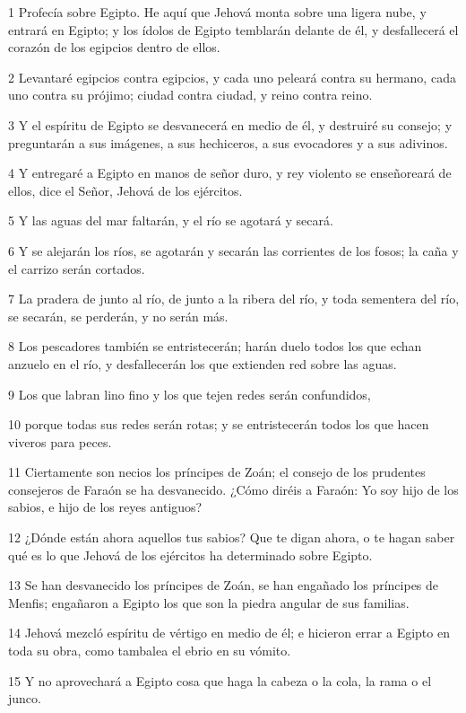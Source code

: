 \par 1 Profecía sobre Egipto. He aquí que Jehová monta sobre una ligera nube, y entrará en Egipto; y los ídolos de Egipto temblarán delante de él, y desfallecerá el corazón de los egipcios dentro de ellos.
\par 2 Levantaré egipcios contra egipcios, y cada uno peleará contra su hermano, cada uno contra su prójimo; ciudad contra ciudad, y reino contra reino.
\par 3 Y el espíritu de Egipto se desvanecerá en medio de él, y destruiré su consejo; y preguntarán a sus imágenes, a sus hechiceros, a sus evocadores y a sus adivinos.
\par 4 Y entregaré a Egipto en manos de señor duro, y rey violento se enseñoreará de ellos, dice el Señor, Jehová de los ejércitos.
\par 5 Y las aguas del mar faltarán, y el río se agotará y secará.
\par 6 Y se alejarán los ríos, se agotarán y secarán las corrientes de los fosos; la caña y el carrizo serán cortados.
\par 7 La pradera de junto al río, de junto a la ribera del río, y toda sementera del río, se secarán, se perderán, y no serán más.
\par 8 Los pescadores también se entristecerán; harán duelo todos los que echan anzuelo en el río, y desfallecerán los que extienden red sobre las aguas.
\par 9 Los que labran lino fino y los que tejen redes serán confundidos,
\par 10 porque todas sus redes serán rotas; y se entristecerán todos los que hacen viveros para peces.
\par 11 Ciertamente son necios los príncipes de Zoán; el consejo de los prudentes consejeros de Faraón se ha desvanecido. ¿Cómo diréis a Faraón: Yo soy hijo de los sabios, e hijo de los reyes antiguos?
\par 12 ¿Dónde están ahora aquellos tus sabios? Que te digan ahora, o te hagan saber qué es lo que Jehová de los ejércitos ha determinado sobre Egipto.
\par 13 Se han desvanecido los príncipes de Zoán, se han engañado los príncipes de Menfis; engañaron a Egipto los que son la piedra angular de sus familias.
\par 14 Jehová mezcló espíritu de vértigo en medio de él; e hicieron errar a Egipto en toda su obra, como tambalea el ebrio en su vómito.
\par 15 Y no aprovechará a Egipto cosa que haga la cabeza o la cola, la rama o el junco.
